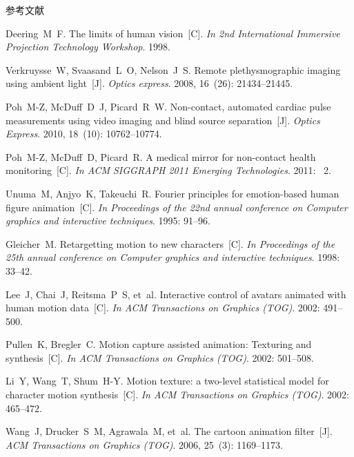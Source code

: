 \documentclass[xcolor=svgnames,serif,table,10pt]{beamer}
\begin{document}
\begin{frame}[allowframebreaks]{参考文献}
\tiny
\sffamily
\begin{thebibliography}{10}

Deering~M~F.
\newblock The limits of human vision~[C].
\newblock \emph{In 2nd International Immersive Projection Technology Workshop}.
1998.

Verkruysse~W, Svaasand~L~O, Nelson~J~S.
\newblock Remote plethysmographic imaging using ambient light~[J].
\newblock \emph{Optics express}.
2008, 16~(26):  21434--21445.

Poh~M-Z, McDuff~D~J, Picard~R~W.
\newblock Non-contact, automated cardiac pulse measurements using video imaging and blind source separation~[J].
\newblock \emph{Optics Express}. 2010, 18~(10):  10762--10774.

Poh~M-Z, McDuff~D, Picard~R.
\newblock A medical mirror for non-contact health monitoring~[C].
\newblock \emph{In ACM SIGGRAPH 2011 Emerging Technologies}. 2011: ~2.

Unuma~M, Anjyo~K, Takeuchi~R.
\newblock Fourier principles for emotion-based human figure animation~[C].
\newblock \emph{In Proceedings of the 22nd annual conference on Computer graphics and
  interactive techniques}.
1995:  91--96.

Gleicher~M.
\newblock Retargetting motion to new characters~[C].
\newblock \emph{In Proceedings of the 25th annual conference on Computer graphics and
  interactive techniques}.
1998:  33--42.

Lee~J, Chai~J, Reitsma~P~S, et~al.
\newblock Interactive control of avatars animated with human motion data~[C].
\newblock \emph{In ACM Transactions on Graphics (TOG)}.
2002:  491--500.

Pullen~K, Bregler~C.
\newblock Motion capture assisted animation: Texturing and synthesis~[C].
\newblock \emph{In ACM Transactions on Graphics (TOG)}.
2002:  501--508.

Li~Y, Wang~T, Shum~H-Y.
\newblock Motion texture: a two-level statistical model for character motion
  synthesis~[C].
\newblock \emph{In ACM Transactions on Graphics (TOG)}.
2002:  465--472.

Wang~J, Drucker~S~M, Agrawala~M, et~al.
\newblock The cartoon animation filter~[J].
\newblock \emph{ACM Transactions on Graphics (TOG)}.
2006, 25~(3):  1169--1173.


\end{thebibliography}
\end{frame}
\end{document}
